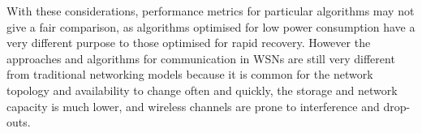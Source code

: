 \documentclass[authoryearcitations]{UoYCSproject}
\begin{document}
With these considerations, performance metrics for particular algorithms may not give a fair comparison, as algorithms optimised for low power consumption have a very different purpose to those optimised for rapid recovery. However the approaches and algorithms for communication in WSNs are still very different from traditional networking models because it is common for the network topology and availability to change often and quickly, the storage and network capacity is much lower, and wireless channels are prone to interference and drop-outs.




\end{document}

